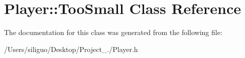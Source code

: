 \hypertarget{class_player_1_1_too_small}{}\section{Player\+:\+:Too\+Small Class Reference}
\label{class_player_1_1_too_small}


The documentation for this class was generated from the following file\+:\begin{DoxyCompactItemize}
\item 
/\+Users/siliguo/\+Desktop/\+Project\+\_./Player.\+h\end{DoxyCompactItemize}
